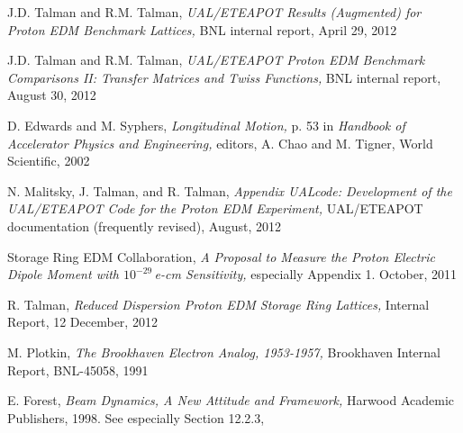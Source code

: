 \documentclass[]{article}
\begin{document}
%
\begin{thebibliography}{99}
J.D. Talman and R.M. Talman, \emph{ UAL/ETEAPOT Results 
(Augmented) for Proton EDM Benchmark Lattices,} BNL internal
report, April 29, 2012

J.D. Talman and R.M. Talman, \emph{ UAL/ETEAPOT Proton EDM 
Benchmark Comparisons II: Transfer Matrices and Twiss Functions,} 
BNL internal report, August 30, 2012

D. Edwards and M. Syphers, \emph{Longitudinal Motion,}
p. 53 in \emph{Handbook of Accelerator Physics and Engineering,}
editors, A. Chao and M. Tigner, World Scientific, 2002

N. Malitsky, J. Talman, and R. Talman, \emph{Appendix UALcode: Development of the
UAL/ETEAPOT Code for the Proton EDM Experiment,} UAL/ETEAPOT documentation
(frequently revised), August, 2012

Storage Ring EDM Collaboration, \emph{A Proposal to Measure the
Proton Electric Dipole Moment with $10^{-29}\,$e-cm Sensitivity,}
especially Appendix 1. October, 2011

R. Talman, \emph{Reduced Dispersion Proton EDM Storage Ring Lattices,}
Internal Report, 12 December, 2012

M. Plotkin, \emph{The Brookhaven Electron Analog, 1953-1957,} 
Brookhaven Internal Report, BNL-45058, 1991

E. Forest, \emph{Beam Dynamics, A New Attitude and Framework,} 
Harwood Academic Publishers, 1998. See especially 
Section 12.2.3,

\end{thebibliography}
\end{document}
